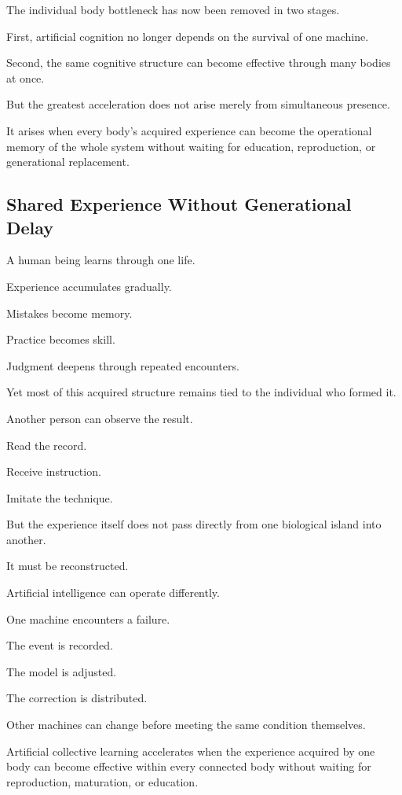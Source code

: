 The individual body bottleneck has now been removed in two stages.

First, artificial cognition no longer depends on the survival of one machine.

Second, the same cognitive structure can become effective through many bodies at once.

But the greatest acceleration does not arise merely from simultaneous presence.

It arises when every body’s acquired experience can become the operational memory of the whole system without waiting for education, reproduction, or generational replacement.


\subsection*{\textbf{Shared Experience Without Generational Delay}} 

A human being learns through one life.

Experience accumulates gradually.

Mistakes become memory.

Practice becomes skill.

Judgment deepens through repeated encounters.

Yet most of this acquired structure remains tied to the individual who formed it.

Another person can observe the result.

Read the record.

Receive instruction.

Imitate the technique.

But the experience itself does not pass directly from one biological island into another.

It must be reconstructed.

Artificial intelligence can operate differently.

One machine encounters a failure.

The event is recorded.

The model is adjusted.

The correction is distributed.

Other machines can change before meeting the same condition themselves.

Artificial collective learning accelerates when the experience acquired by one body can become effective within every connected body without waiting for reproduction, maturation, or education.

